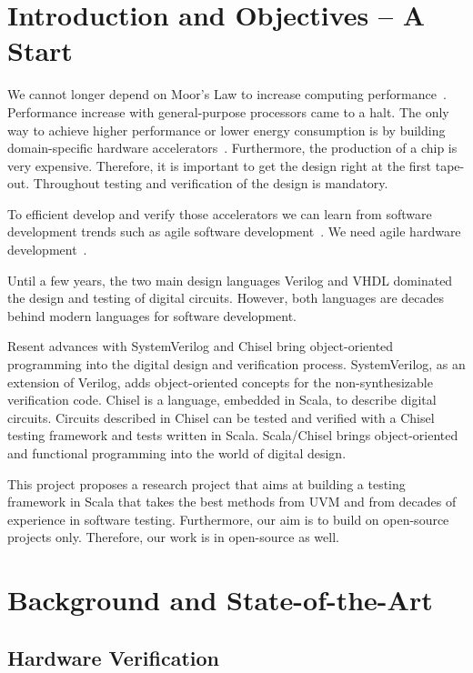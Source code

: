 \documentclass[fleqn,12pt]{article}
\begin{document}
\section{Introduction and Objectives -- A Start}
\label{sec:objectives}

We cannot longer depend on Moor's Law to increase computing performance~\cite{dark-silicon:2011}.
Performance increase with general-purpose processors came to a halt.
The only way to achieve higher performance or lower energy consumption
is by building domain-specific hardware accelerators~\cite{domain-hw-acc:2020}.
Furthermore, the production of a chip is very expensive. Therefore, it is important to get the design right
at the first tape-out. Throughout testing and verification of the design is mandatory.

To efficient develop and verify those accelerators we can learn from software development trends
such as agile software development~\cite{agile:manifesto}.
We need agile hardware development~\cite{henn-patt:turing:2019}.

Until a few years, the two main design languages Verilog and VHDL dominated the
design and testing of digital circuits. However, both languages are decades behind
modern languages for software development.

Resent advances with SystemVerilog and Chisel bring object-oriented programming
into the digital design and verification process. SystemVerilog, as an extension of Verilog,
adds object-oriented concepts for the non-synthesizable verification code.
Chisel is a language, embedded in Scala, to describe digital circuits.
Circuits described in Chisel can be tested and verified with a Chisel testing
framework and tests written in Scala.
Scala/Chisel brings object-oriented and functional programming into the world of
digital design.

This project proposes a research project that aims at building a testing framework
in Scala that takes the best methods from UVM and from decades of experience
in software testing.
Furthermore, our aim is to build on open-source projects only. Therefore, our
work is in open-source as well.


\section{Background and State-of-the-Art}
\label{sec:background}


\subsection{Hardware Verification}
\end{document}
